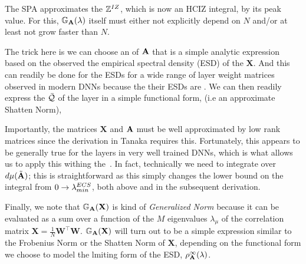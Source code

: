 The SPA approximates the \PartitionFunction $\mathbb{Z}^{IZ}$, which is now an HCIZ integral,  by its peak value.
For this, $\mathbb{G}_{\mathbf{A}}(\lambda)$ itself must either not explicitly depend on $N$ and/or at least not grow faster than $N$.

The trick here is we can choose an \RTransform of $\mathbf{\mathbf{A}}$
that is a simple analytic expression based on the observed
the empirical spectral density (ESD) of the $\mathbf{X}$.
And this can readily be done for the ESDs for a wide range of layer weight matrices
observed in modern DNNs because the their ESDs are \HeavyTailed \PowerLaw\cite{MM19_HTSR_ICML}.
We can then readily express the \Quality $\bar{\mathcal{Q}}$ of the \Teacher
layer in a simple functional form, (i.e  an approximate Shatten Norm),

Importantly, the matrices $\mathbf{X}$  and $\mathbf{\mathbf{A}}$ must be well approximated
by low rank matrices since the derivation in Tanaka requires this.  Fortunately,
this appears to be generally true for the layers in very well trained DNNs,
which is what allows us to apply this withing the~\ECS.
In fact, technically we need to integrate over $d\mu(\tilde{\mathbf{A}})$; this is straightforward
as this simply changes the lower bound on the integral from $0\rightarrow\lambda^{ECS}_{min}$,
both above and in the subsequent derivation.

Finally, we note that $\mathbb{G}_{\mathbf{A}}(\mathbf{X})$ is kind of \emph{Generalized Norm} because 
it can be evaluated as a sum over a function of the $M$ eigenvalues $\lambda_{\mu}$ of the \Teacher
correlation matrix $\mathbf{X}=\frac{1}{N}\mathbf{W}^{\top}\mathbf{W}$.
$\mathbb{G}_{\mathbf{A}}(\mathbf{X})$  will turn out to be a simple expression similar to the Frobenius Norm or the
Shatten Norm of $\mathbf{X}$, depending on the functional form we choose to model the
lmiting form of the \Student ESD, $\rho_{\mathbf{A}}^{\infty}(\lambda)$.

